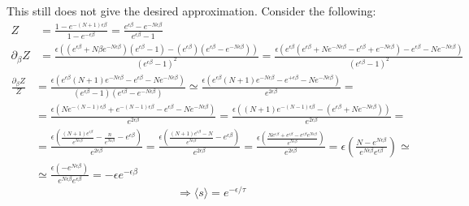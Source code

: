 \documentclass[twoside]{amsart}
\theoremstyle{plain}
\theoremstyle{definition}
\begin{document}
\begin{itemize}
This still does not give the desired approximation.  Consider the following:
\[
\begin{aligned}
  Z & = \frac{ 1 - e^{ - (N+1) \epsilon \beta } }{ 1 - e^{- \epsilon \beta} } = \frac{ e^{\epsilon \beta} - e^{-N \epsilon \beta} }{ e^{\epsilon \beta} - 1 } \\
  \partial_{\beta} Z & = \frac{ \epsilon ( ( e^{\epsilon \beta} + N\beta e^{-N \epsilon \beta}  ) (e^{\epsilon \beta} - 1 ) - (e^{\epsilon \beta} )(e^{\epsilon \beta} - e^{- N \epsilon \beta} )  ) }{ (e^{\epsilon \beta} - 1 )^2 } = \frac{ \epsilon ( e^{\epsilon \beta} (e^{ \epsilon \beta} + N e^{- N\epsilon \beta} - e^{\epsilon \beta}  + e^{-N \epsilon \beta} ) - e^{ \epsilon \beta} - N e^{-N \epsilon \beta} ) }{ (e^{ \epsilon \beta} - 1 )^2 }
\end{aligned}
\]
\[
\begin{aligned}
  \frac{ \partial_{\beta} Z}{Z} & = \frac{ \epsilon (e^{\epsilon \beta} ( N+1)e^{-N\epsilon \beta } - e^{\epsilon \beta} - N e^{-N \epsilon \beta} ) }{ (e^{\epsilon \beta} - 1 ) (e^{\epsilon \beta} - e^{-N\epsilon \beta} ) } \simeq \frac{ \epsilon (e^{\epsilon \beta} (  N + 1) e^{-N \epsilon \beta} -e^{+ \epsilon \beta} - N e^{-N \epsilon \beta} ) }{ e^{2\epsilon \beta} }= \\ 
& = \frac{ \epsilon (Ne^{- (N-1) \epsilon \beta} + e^{-(N-1) \epsilon \beta} - e^{\epsilon \beta} - N e^{-N \epsilon \beta} ) }{ e^{2\epsilon \beta} }  = \frac{ \epsilon ( (N+1) e^{-(N-1) \epsilon \beta } - (e^{\epsilon \beta} + Ne^{-N \epsilon \beta} ) ) }{ e^{2\epsilon \beta} } = \\
  & = \frac{ \epsilon \left( \frac{ (N+1) e^{\epsilon \beta} }{ e^{N \epsilon \beta} } - \frac{n}{e^{N\epsilon \beta} } - e^{\epsilon \beta} \right) }{ e^{2\epsilon \beta} } = \frac{ \epsilon \left( \frac{ (N+1) e^{\epsilon \beta}  - N }{ e^{N\epsilon \beta} } - e^{\epsilon \beta} \right) }{ e^{2\epsilon \beta} } = \frac{ \epsilon \left( \frac{ N e^{\epsilon \beta}  + e^{\epsilon \beta} - e^{\epsilon \beta} e^{N \epsilon \beta} }{ e^{N \epsilon \beta} } \right) }{ e^{2 \epsilon \beta}} = \epsilon \left( \frac{ N - e^{N \epsilon \beta} }{ e^{N \epsilon \beta} e^{\epsilon \beta} } \right)  \simeq \\
  & \simeq \frac{ \epsilon ( -e^{N \epsilon \beta}  ) }{ e^{N \epsilon \beta} e^{\epsilon \beta} } = -\epsilon e^{-\epsilon \beta} 
\end{aligned}
\]
\[
\Longrightarrow \boxed{ \langle s \rangle = e^{- \epsilon /\tau }   }
\]
\end{itemize}
\end{document}
